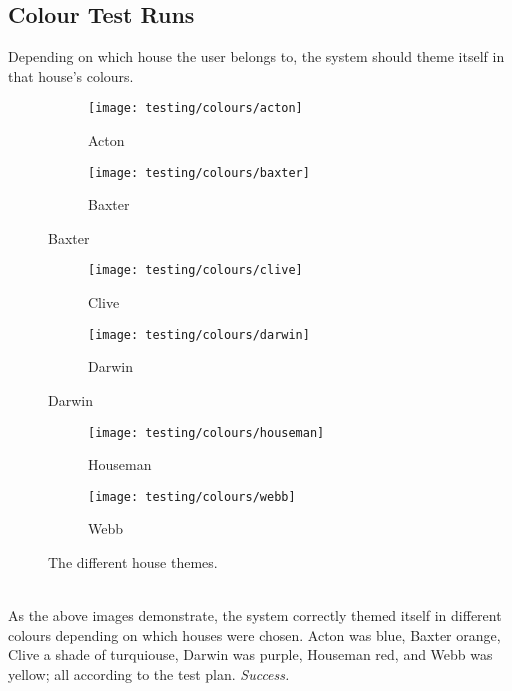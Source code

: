 \clearpage
\subsection{Colour Test Runs} %
\label{sub:colour_tests}
Depending on which house the user belongs to, the system should theme itself in that house's colours.

\begin{figure}[!htbp]
\centering
\begin{subfigure}{0.5\textwidth}
  \centering
  \texttt{[image: testing/colours/acton]}
  \caption{Acton}
  \label{fig:sub1}
\end{subfigure}%
\begin{subfigure}{0.5\textwidth}
  \centering
  \texttt{[image: testing/colours/baxter]}
  \caption{Baxter}
  \label{fig:sub2}
\end{subfigure}
\label{fig:test}
\end{figure}

\begin{figure}[!htbp]
\centering
\begin{subfigure}{0.5\textwidth}
  \centering
  \texttt{[image: testing/colours/clive]}
  \setcounter{subfigure}{2}%
  \caption{Clive}
  \label{fig:sub1}
\end{subfigure}%
\begin{subfigure}{0.5\textwidth}
  \centering
  \texttt{[image: testing/colours/darwin]}
  \setcounter{subfigure}{3}%
  \caption{Darwin}
  \label{fig:sub2}
\end{subfigure}
\label{fig:test}
\end{figure}

\begin{figure}[!htbp]
\centering
\begin{subfigure}{0.5\textwidth}
  \centering
  \texttt{[image: testing/colours/houseman]}
  \setcounter{subfigure}{4}%
  \caption{Houseman}
  \label{fig:sub1}
\end{subfigure}%
\begin{subfigure}{0.5\textwidth}
  \centering
  \texttt{[image: testing/colours/webb]}
  \setcounter{subfigure}{5}%
  \caption{Webb}
  \label{fig:sub2}
\end{subfigure}
\caption{The different house themes.}
\label{fig:test}
\end{figure}
\\As the above images demonstrate, the system correctly themed itself in different colours depending on which houses were chosen. Acton was blue, Baxter orange, Clive a shade of turquiouse, Darwin was purple, Houseman red, and Webb was yellow; all according to the test plan. \textit{Success.}
